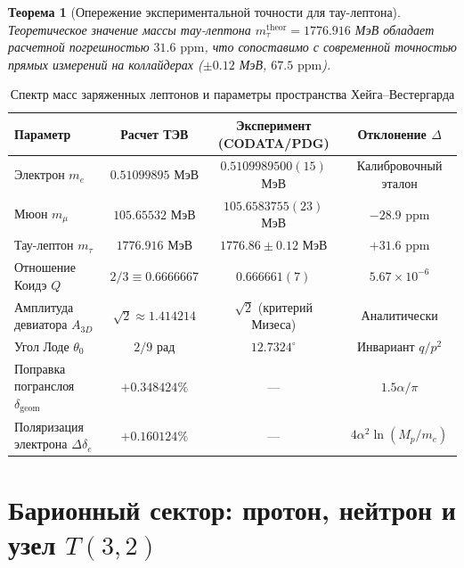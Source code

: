 \documentclass[11pt,a4paper]{article}
\newtheorem{theorem}{Теорема}[section]
\theoremstyle{definition}
\theoremstyle{remark}
\begin{document}
\begin{theorem}[Опережение экспериментальной точности для тау-лептона]
Теоретическое значение массы тау-лептона $m_\tau^{\mathrm{theor}} = 1776.916$ МэВ обладает расчетной погрешностью $31.6\text{ ppm}$, что сопоставимо с современной точностью прямых измерений на коллайдерах ($\pm 0.12$ МэВ, $67.5\text{ ppm}$).
\end{theorem}

\begin{table}[H]
\centering
\small
\caption{Спектр масс заряженных лептонов и параметры пространства Хейга--Вестергарда}
\label{tab:leptons}
\vspace{2mm}
\begin{tabular}{lccc}
\toprule
\textbf{Параметр} & \textbf{Расчет ТЭВ} & \textbf{Эксперимент (CODATA/PDG)} & \textbf{Отклонение $\Delta$} \\
\midrule
Электрон $m_e$ & $0.51099895$ МэВ & $0.5109989500(15)$ МэВ & Калибровочный эталон \\
Мюон $m_\mu$ & $105.65532$ МэВ & $105.6583755(23)$ МэВ & $-28.9\text{ ppm}$ \\
Тау-лептон $m_\tau$ & $1776.916$ МэВ & $1776.86 \pm 0.12$ МэВ & $+31.6\text{ ppm}$ \\
Отношение Коидэ $Q$ & $2/3 \equiv 0.6666667$ & $0.666661(7)$ & $5.67 \times 10^{-6}$ \\
Амплитуда девиатора $A_{3D}$ & $\sqrt{2} \approx 1.414214$ & $\sqrt{2}$ (критерий Мизеса) & Аналитически \\
Угол Лоде $\theta_0$ & $2/9$ рад & $12.7324^\circ$ & Инвариант $q/p^2$ \\
Поправка погранслоя $\delta_{\mathrm{geom}}$ & $+0.348424\%$ & --- & $1.5\alpha/\pi$ \\
Поляризация электрона $\Delta\delta_e$ & $+0.160124\%$ & --- & $4\alpha^2\ln(M_p/m_e)$ \\
\bottomrule
\end{tabular}
\end{table}


\section{Барионный сектор: протон, нейтрон и узел $T(3,2)$}
\label{sec:baryons}
\end{document}
